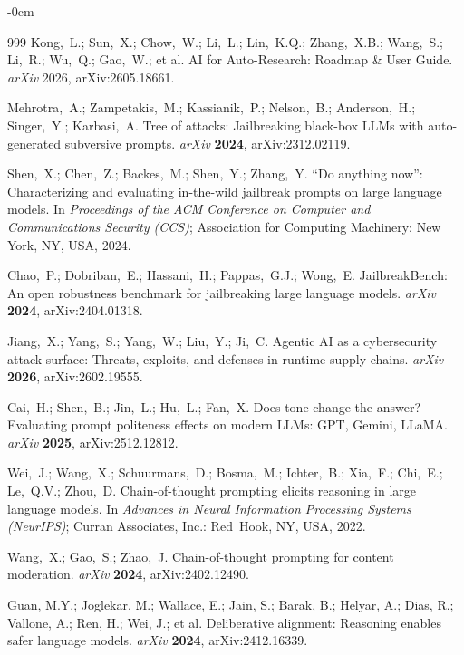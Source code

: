\documentclass[superintelligence,article,accept,moreauthors]{Definitions/mdpi}
\renewcommand{\hl}[1]{#1}
\begin{document}
\begin{adjustwidth}{-\extralength}{0cm}
{\begin{thebibliography}{999}
Kong,~L.; Sun,~X.; Chow,~W.; Li,~L.; Lin,~K.Q.; Zhang,~X.B.; Wang,~S.; Li,~R.; Wu,~Q.; Gao,~W.; et al.
AI for Auto-Research: Roadmap \& User Guide.
{\em arXiv} 2026, arXiv:2605.18661.

Mehrotra,~A.; Zampetakis,~M.; Kassianik,~P.; Nelson,~B.; Anderson,~H.; Singer,~Y.; Karbasi,~A.
Tree of attacks: Jailbreaking black-box {LLMs} with auto-generated subversive prompts.
{\em arXiv} {\bf 2024}, arXiv:2312.02119.


Shen,~X.; Chen,~Z.; Backes,~M.; Shen,~Y.; Zhang,~Y.
``{D}o anything now'': Characterizing and evaluating in-the-wild jailbreak prompts on large language models.
In {\em Proceedings of the ACM Conference on Computer and Communications Security (CCS)}; \hl{Association for Computing Machinery: New York, NY, USA,} 2024.

Chao,~P.; Dobriban,~E.; Hassani,~H.; Pappas,~G.J.; Wong,~E.
{JailbreakBench}: An open robustness benchmark for jailbreaking large language models.
{\em arXiv} {\bf 2024}, arXiv:2404.01318.

Jiang,~X.; Yang,~S.; Yang,~W.; Liu,~Y.; Ji,~C.
Agentic {AI} as a cybersecurity attack surface: Threats, exploits, and defenses in runtime supply chains.
{\em arXiv} {\bf 2026}, arXiv:2602.19555.

Cai,~H.; Shen,~B.; Jin,~L.; Hu,~L.; Fan,~X.
Does tone change the answer? {E}valuating prompt politeness effects on modern {LLMs}: {GPT}, {Gemini}, {LLaMA}.
{\em arXiv} {\bf 2025}, arXiv:2512.12812.

Wei,~J.; Wang,~X.; Schuurmans,~D.; Bosma,~M.; Ichter,~B.; Xia,~F.; Chi,~E.; Le,~Q.V.; Zhou,~D.
Chain-of-thought prompting elicits reasoning in large language models.
In {\em Advances in Neural Information Processing Systems (NeurIPS)}; \hl{Curran Associates, Inc.: Red~Hook, NY, USA,} 2022.

Wang,~X.; Gao,~S.; Zhao,~J.
Chain-of-thought prompting for content moderation.
{\em arXiv} {\bf 2024}, arXiv:2402.12490.

\hl{Guan, M.Y.; Joglekar, M.; Wallace, E.; Jain, S.; Barak, B.; Helyar, A.; Dias, R.; Vallone, A.; Ren, H.; Wei, J.; et al.} %
Deliberative alignment: Reasoning enables safer language models.
{\em arXiv} {\bf 2024}, arXiv:2412.16339.


\end{thebibliography}}
\end{adjustwidth}
\end{document}
